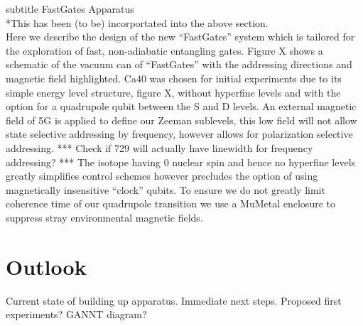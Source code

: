 \documentclass[12pt]{iopart}
\begin{document}

subtitle FastGates Apparatus\\
*This has been (to be) incorportated into the above section. \\

Here we describe the design of the new ``FastGates'' system which is
tailored for the exploration of fast, non-adiabatic entangling
gates. Figure X shows a schematic of the vacuum can of ``FastGates''
with the addressing directions and magnetic field highlighted. Ca40
was chosen for initial experiments due to its simple energy level
structure, figure X, without hyperfine levels and with the option for
a quadrupole qubit between the S and D levels. An external magnetic
field of 5G is applied to define our Zeeman sublevels, this low field
will not allow state selective addressing by frequency, however allows
for polarization selective addressing. *** Check if 729 will actually
have linewidth for frequency addressing? *** The isotope having 0
nuclear spin and hence no hyperfine levels greatly simplifies control
schemes however precludes the option of using magnetically insensitive
``clock'' qubits. To ensure we do not greatly limit coherence time of
our quadrupole transition we use a MuMetal enclosure to suppress stray
environmental magnetic fields.



\section{Outlook}
    Current state of building up apparatus.
    Immediate next steps.
    Proposed first experiments?
    GANNT diagram?

  
\end{document}
